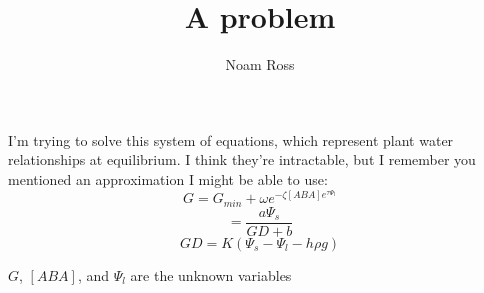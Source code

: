 \documentclass[12pt]{amsart}
\title{A problem}
\author{Noam Ross}
\begin{document}
\maketitle

I'm trying to solve this system of equations, which represent plant water relationships at equilibrium.  I think they're intractable, but I remember you mentioned an approximation I might be able to use:
\begin{equation}
G = G_{min} + \omega e^{-\zeta [ABA] e^{\tau \Psi_l}}
\end{equation}
\begin{equation}
[ABA] = \frac{a \Psi_s}{GD + b}
\end{equation}
\begin{equation}
GD = K(\Psi_s - \Psi_l - h \rho g)
\end{equation}

$G$, $[ABA]$, and $\Psi_l$ are the unknown variables
\end{document}
